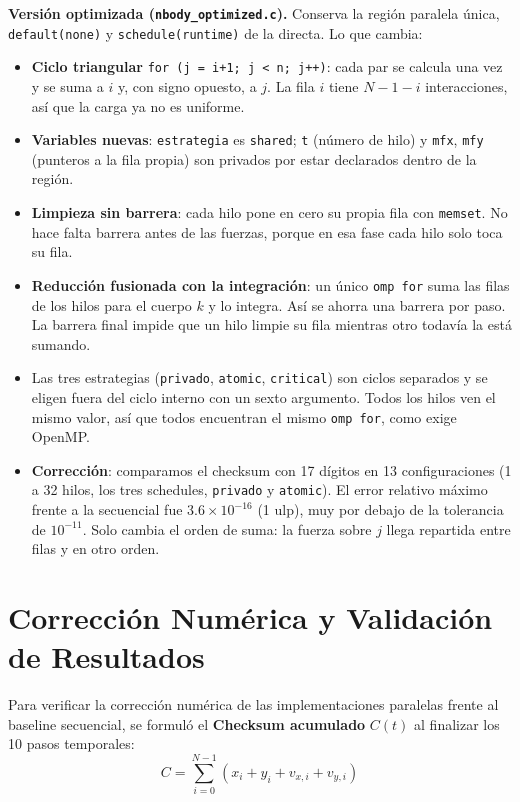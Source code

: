 \documentclass[11pt,a4paper]{article}
\begin{document}
\textbf{Versión optimizada (\texttt{nbody\_optimized.c}).} Conserva la región paralela única, \texttt{default(none)} y \texttt{schedule(runtime)} de la directa. Lo que cambia:
\begin{itemize}
    \item \textbf{Ciclo triangular} \texttt{for (j = i+1; j < n; j++)}: cada par se calcula una vez y se suma a $i$ y, con signo opuesto, a $j$. La fila $i$ tiene $N-1-i$ interacciones, así que la carga ya no es uniforme.
    \item \textbf{Variables nuevas}: \texttt{estrategia} es \texttt{shared}; \texttt{t} (número de hilo) y \texttt{mfx}, \texttt{mfy} (punteros a la fila propia) son privados por estar declarados dentro de la región.
    \item \textbf{Limpieza sin barrera}: cada hilo pone en cero su propia fila con \texttt{memset}. No hace falta barrera antes de las fuerzas, porque en esa fase cada hilo solo toca su fila.
    \item \textbf{Reducción fusionada con la integración}: un único \texttt{omp for} suma las filas de los hilos para el cuerpo $k$ y lo integra. Así se ahorra una barrera por paso. La barrera final impide que un hilo limpie su fila mientras otro todavía la está sumando.
    \item Las tres estrategias (\texttt{privado}, \texttt{atomic}, \texttt{critical}) son ciclos separados y se eligen fuera del ciclo interno con un sexto argumento. Todos los hilos ven el mismo valor, así que todos encuentran el mismo \texttt{omp for}, como exige OpenMP.
    \item \textbf{Corrección}: comparamos el checksum con 17 dígitos en 13 configuraciones (1 a 32 hilos, los tres schedules, \texttt{privado} y \texttt{atomic}). El error relativo máximo frente a la secuencial fue $3.6 \times 10^{-16}$ (1 ulp), muy por debajo de la tolerancia de $10^{-11}$. Solo cambia el orden de suma: la fuerza sobre $j$ llega repartida entre filas y en otro orden.
\end{itemize}

\section{Corrección Numérica y Validación de Resultados}

Para verificar la corrección numérica de las implementaciones paralelas frente al baseline secuencial, se formuló el \textbf{Checksum acumulado} $C(t)$ al finalizar los 10 pasos temporales:
\begin{equation}
    C = \sum_{i=0}^{N-1} \left( x_i + y_i + v_{x,i} + v_{y,i} \right)
    \label{eq:checksum}
\end{equation}
\end{document}
